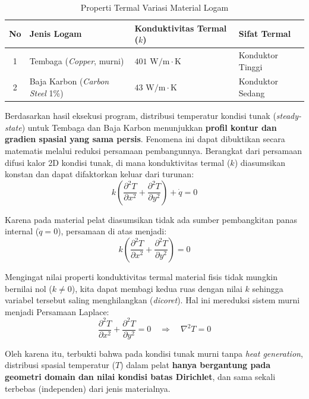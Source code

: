 \documentclass[12pt,a4paper]{article}
\begin{document}
\begin{table}[h!]
\centering
\caption{Properti Termal Variasi Material Logam \cite{incropera_principles_2013}}
\renewcommand{\arraystretch}{1.25}
\begin{tabular}{|c|p{}|p{}|p{}|}
\hline
\textbf{No} & \centering\textbf{Jenis Logam} & \centering\textbf{Konduktivitas Termal ($k$)} & \centering\arraybackslash\textbf{Sifat Termal} \\
\hline
1 & Tembaga (\textit{Copper}, murni) & $401\text{ W/m}\cdot\text{K}$ & Konduktor Tinggi \\
\hline
2 & Baja Karbon (\textit{Carbon Steel} 1\%) & $43\text{ W/m}\cdot\text{K}$ & Konduktor Sedang \\
\hline
\end{tabular}
\end{table}

Berdasarkan hasil eksekusi program, distribusi temperatur kondisi tunak (\textit{steady-state}) untuk Tembaga dan Baja Karbon menunjukkan \textbf{profil kontur dan gradien spasial yang sama persis}. Fenomena ini dapat dibuktikan secara matematis melalui reduksi persamaan pembangunnya. Berangkat dari persamaan difusi kalor 2D kondisi tunak, di mana konduktivitas termal ($k$) diasumsikan konstan dan dapat difaktorkan keluar dari turunan:
\begin{equation}
    k \left( \frac{\partial^2 T}{\partial x^2} + \frac{\partial^2 T}{\partial y^2} \right) + \dot{q} = 0
\end{equation}

Karena pada material pelat diasumsikan tidak ada sumber pembangkitan panas internal ($\dot{q} = 0$), persamaan di atas menjadi:
\begin{equation}
    k \left( \frac{\partial^2 T}{\partial x^2} + \frac{\partial^2 T}{\partial y^2} \right) = 0
\end{equation}

Mengingat nilai properti konduktivitas termal material fisis tidak mungkin bernilai nol ($k \neq 0$), kita dapat membagi kedua ruas dengan nilai $k$ sehingga variabel tersebut saling menghilangkan (\textit{dicoret}). Hal ini mereduksi sistem murni menjadi Persamaan Laplace:
\begin{equation} \label{eq:laplace_reduced}
    \frac{\partial^2 T}{\partial x^2} + \frac{\partial^2 T}{\partial y^2} = 0 \quad \Longrightarrow \quad \nabla^2 T = 0
\end{equation}

Oleh karena itu, terbukti bahwa pada kondisi tunak murni tanpa \textit{heat generation}, distribusi spasial temperatur ($T$) dalam pelat \textbf{hanya bergantung pada geometri domain dan nilai kondisi batas Dirichlet}, dan sama sekali terbebas (independen) dari jenis materialnya.
\end{document}

